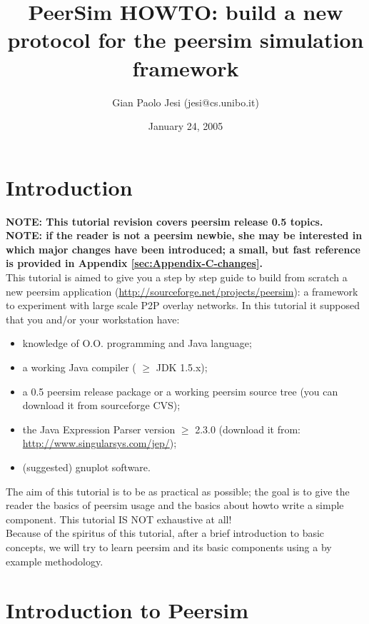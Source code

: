 \documentclass[a4paper,11pt]{article}
\title{PeerSim HOWTO: build a new protocol for the peersim simulation
framework}
\author{Gian Paolo Jesi (jesi@cs.unibo.it)}
\date{January 24, 2005}
\begin{document}
\maketitle



\section{Introduction}

\textbf{NOTE: This tutorial revision covers peersim release 0.5
  topics.}\\


\textbf{NOTE: if the reader is not a peersim newbie, she may be
  interested in which major changes have been introduced; a small, but
  fast reference is provided in Appendix \ref{sec:Appendix-C-changes}.}\\


This tutorial is aimed to give you a step by step guide to build from
scratch a new peersim application (\url{http://sourceforge.net/projects/peersim}):
a framework to experiment with large scale P2P overlay networks. In
this tutorial it supposed that you and/or your workstation have: 

\begin{itemize}
\item knowledge of O.O. programming and Java language;
\item a working Java compiler ( $\geq$ JDK 1.5.x);
\item a 0.5 peersim release package or a working peersim source tree
  (you can download it from sourceforge
 CVS);
\item the Java Expression Parser version $\geq$ 2.3.0 (download it from: \url{http://www.singularsys.com/jep/});
\item (suggested) gnuplot software. 
\end{itemize}

The aim of this tutorial is to be
as practical as possible; the goal is to give the reader the basics
of peersim usage and the basics about howto write a simple component.
This tutorial IS NOT exhaustive at all!\\
Because of the spiritus of this tutorial,
after a brief introduction to basic concepts, we will try to learn peersim 
and its basic components
using a by example methodology.


\section{Introduction to Peersim}
\end{document}
